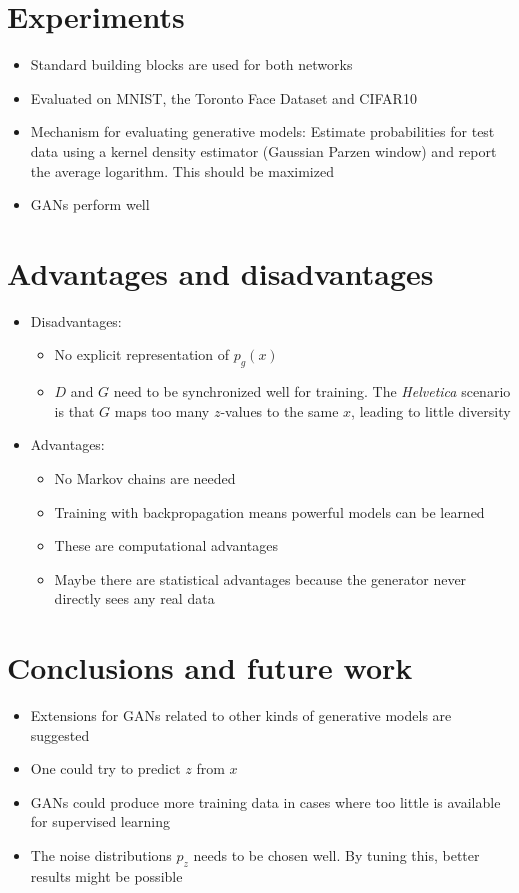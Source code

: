 \documentclass{article}
\begin{document}
\section{Experiments}

\begin{itemize}
    \item Standard building blocks are used for both networks
    \item Evaluated on MNIST, the Toronto Face Dataset and CIFAR10
    \item Mechanism for evaluating generative models: Estimate probabilities for test data using a kernel density estimator (Gaussian Parzen window) and report the average logarithm. This should be maximized
    \item GANs perform well
\end{itemize}

\section{Advantages and disadvantages}

\begin{itemize}
    \item Disadvantages:
    \begin{itemize}
        \item No explicit representation of $p_g(x)$
        \item $D$ and $G$ need to be synchronized well for training. The \emph{Helvetica} scenario is that $G$ maps too many $z$-values to the same $x$, leading to little diversity
    \end{itemize}
    \item Advantages:
    \begin{itemize}
        \item No Markov chains are needed
        \item Training with backpropagation means powerful models can be learned
        \item These are computational advantages
        \item Maybe there are statistical advantages because the generator never directly sees any real data
    \end{itemize}
\end{itemize}

\section{Conclusions and future work}

\begin{itemize}
    \item Extensions for GANs related to other kinds of generative models are suggested
    \item One could try to predict $z$ from $x$
    \item GANs could produce more training data in cases where too little is available for supervised learning
    \item The noise distributions $p_z$ needs to be chosen well. By tuning this, better results might be possible
\end{itemize}
\end{document}
